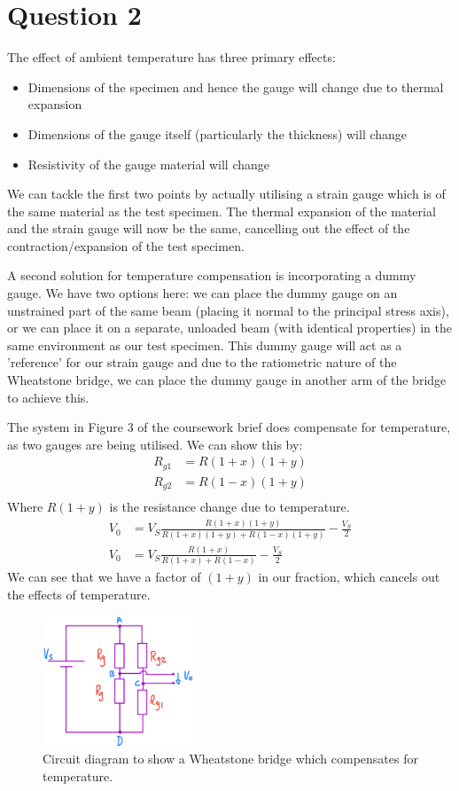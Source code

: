 \documentclass[12pt]{article}
\numberwithin{equation}{section}
\begin{document}
\section{Question 2}
The effect of ambient temperature has three primary effects:
\begin{itemize}
  \item Dimensions of the specimen and hence the gauge will change due to thermal expansion
  \item Dimensions of the gauge itself (particularly the thickness) will change
  \item Resistivity of the gauge material will change
\end{itemize}
We can tackle the first two points by actually utilising a strain gauge which is of the same material as the test specimen. The thermal expansion of the material and the strain gauge will now be the same, cancelling out the effect of the contraction/expansion of the test specimen.

A second solution for temperature compensation is incorporating a dummy gauge. We have two options here: we can place the dummy gauge on an unstrained part of the same beam (placing it normal to the principal stress axis), or we can place it on a separate, unloaded beam (with identical properties) in the same environment as our test specimen. This dummy gauge will act as a 'reference' for our strain gauge and due to the ratiometric nature of the Wheatstone bridge, we can place the dummy gauge in another arm of the bridge to achieve this. 

The system in Figure 3 of the coursework brief does compensate for temperature, as two gauges are being utilised. We can show this by:
\begin{align}
  R_{g1} &= R(1+x)(1+y)\\
  R_{g2} &= R(1-x)(1+y)\\
\end{align}
Where $R(1+y)$ is the resistance change due to temperature.
\begin{align}
  V_0 &= V_S \frac{R(1+x)(1+y)}{R(1+x)(1+y) + R(1-x)(1+y)} - \frac{V_S}{2}\\
  V_0 &= V_S \frac{R(1+x)}{R(1+x) + R(1-x)} - \frac{V_S}{2}
\end{align}
We can see that we have a factor of $(1+y)$ in our fraction, which cancels out the effects of temperature.
\begin{figure}[H]
  \centering
  \includegraphics[width=0.4\textwidth]{./img/4-1circuit.png}
  \caption{Circuit diagram to show a Wheatstone bridge which compensates for temperature.}
\end{figure}
\end{document}
